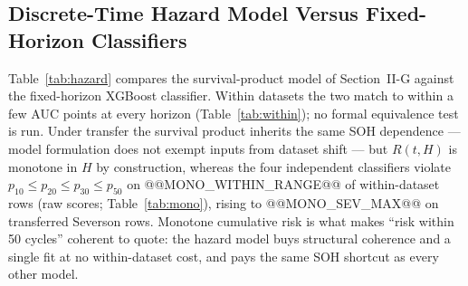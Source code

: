 \subsection{Discrete-Time Hazard Model Versus Fixed-Horizon Classifiers}
Table~\ref{tab:hazard} compares the survival-product model of Section~II-G against the fixed-horizon XGBoost classifier. Within datasets the two match to within a few AUC points at every horizon (Table~\ref{tab:within}); no formal equivalence test is run. Under transfer the survival product inherits the same SOH dependence --- model formulation does not exempt inputs from dataset shift --- but $R(t,H)$ is monotone in $H$ by construction, whereas the four independent classifiers violate $p_{10}\le p_{20}\le p_{30}\le p_{50}$ on @@MONO_WITHIN_RANGE@@ of within-dataset rows (raw scores; Table~\ref{tab:mono}), rising to @@MONO_SEV_MAX@@ on transferred Severson rows. Monotone cumulative risk is what makes ``risk within 50 cycles'' coherent to quote: the hazard model buys structural coherence and a single fit at no within-dataset cost, and pays the same SOH shortcut as every other model.

\begin{table}[!t]
\caption{Discrete-Time Hazard Model at H=20: Transfer Performance (Pooled AUC [CI]). The Fixed-Horizon XGBoost Comparator With SOH Is in Table~\ref{tab:crosswith}.}
\label{tab:hazard}
\centering
{}
\end{table}

\begin{table}[!t]
\caption{Monotonicity Violations: Share of Scored Rows With $p_{10}\le p_{20}\le p_{30}\le p_{50}$ Failing, on Raw Scores (Platt in Parentheses). The Survival Product Is Monotone by Construction (Rate 0).}
\label{tab:mono}
\centering
{}
\end{table}

